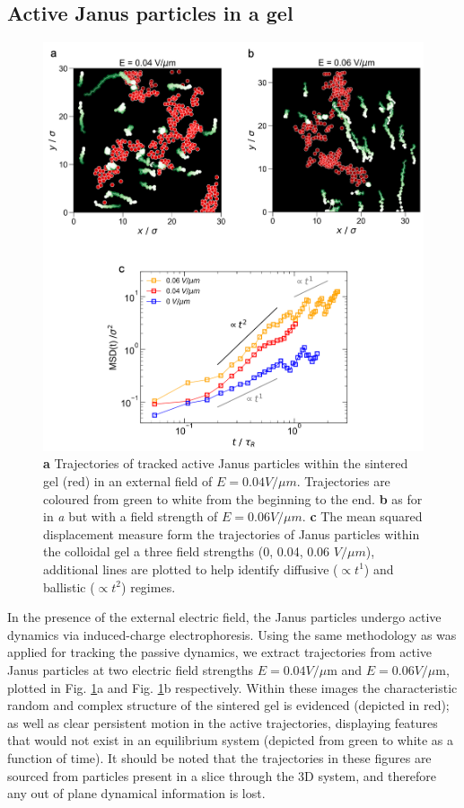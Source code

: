 \subsection{Active Janus particles in a gel}
\begin{figure}
	\centering
	\includegraphics[width=\linewidth]{figsExpSystem/figJanusActive.png}
	\caption[Active Janus particles in a gel]{\textbf{a} Trajectories of tracked active Janus particles within the sintered gel (red) in an external field of $E = 0.04V/\mu m$. Trajectories are coloured from green to white from the beginning to the end. \textbf{b} as for in \textit{a} but with a field strength of $E = 0.06 V/\mu m$. \textbf{c} The mean squared displacement measure form the trajectories of Janus particles within the colloidal gel a three field strengths (0, 0.04, 0.06 $V/\mu m$), additional lines are plotted to help identify diffusive ($\propto t^1$) and ballistic ($\propto t^2$) regimes.}
	\label{fig:expActive}
\end{figure}




In the presence of the external electric field, the Janus particles undergo active dynamics via induced-charge electrophoresis. Using the same methodology as was applied for tracking the passive dynamics, we extract trajectories from active Janus particles at two electric field strengths $E = 0.04 V/\mu$m and $E = 0.06 V/\mu$m, plotted in Fig. \ref{fig:expActive}a and Fig. \ref{fig:expActive}b respectively. Within these images the characteristic random and complex structure of the sintered gel is evidenced (depicted in red); as well as clear persistent motion in the active trajectories, displaying features that would not exist in an equilibrium system (depicted from green to white as a function of time). It should be noted that the trajectories in these figures are sourced from particles present in a slice through the 3D system, and therefore any out of plane dynamical information is lost.


